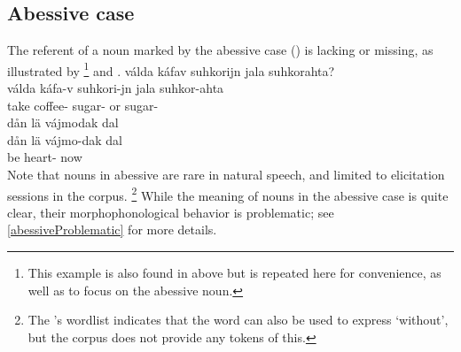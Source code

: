 \subsection{Abessive case}\label{abessive}
The referent of a noun marked by the abessive case (\ABESSs) is lacking or missing, as illustrated by \footnote{This example is also found in  above but is repeated here for convenience, as well as to focus on the abessive noun.} 
and . 
\ea\label{abess1}
\glll	válda káfav suhkorijn jala {suhkorahta?}\\
	válda káfa-v suhkori-jn jala suhkor-ahta\\
	take\BS{} coffee- sugar- or sugar-\\\nopagebreak
{} 
\z
%
\ea\label{abess2}
\glll	dån lä {vájmodak} dal\\
	dån lä vájmo-dak dal\\
	 be\BS{} heart- now\\\nopagebreak
{} 
\z
Note that nouns in abessive are rare in natural speech, and limited to elicitation sessions in the corpus.%
\footnote{The \WLP’s wordlist indicates that the word  can also be used to express ‘without’, but the corpus does not provide any tokens of this.} 
While the meaning of nouns in the abessive case is quite clear, their morphophonological behavior is problematic; see \SEC\ref{abessiveProblematic} for more details.


